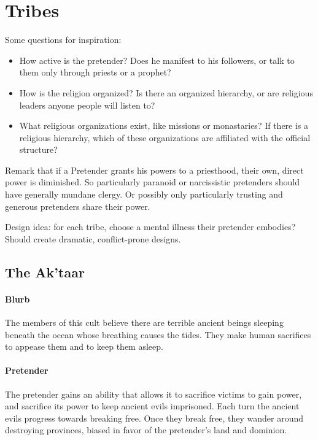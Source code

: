 \documentclass[12pt,letterpaper]{article}
\begin{document}
\section{Tribes}

Some questions for inspiration:
\begin{itemize}
	\item How active is the pretender?
	      Does he manifest to his followers,
	      or talk to them only through priests or a prophet?
	\item How is the religion organized?
	      Is there an organized hierarchy,
	      or are religious leaders anyone people will listen to?
	\item What religious organizations exist,
	      like missions or monastaries?
	      If there is a religious hierarchy,
	      which of these organizations are affiliated with the official structure?
\end{itemize}

Remark that if a Pretender grants his powers to a priesthood,
their own, direct power is diminished.
So particularly paranoid or narcissistic pretenders
should have generally mundane clergy.
Or possibly only particularly trusting and generous pretenders
share their power.

Design idea: for each tribe, choose a mental illness their pretender embodies?
Should create dramatic, conflict-prone designs.

\subsection{The Ak'taar}

\paragraph{Blurb}

The members of this cult believe there are terrible ancient beings
sleeping beneath the ocean whose breathing causes the tides.
They make human sacrifices to appease them and to keep them asleep.

\paragraph{Pretender}

The pretender gains an ability that allows it to sacrifice victims to gain power,
and sacrifice its power to keep ancient evils imprisoned.
Each turn the ancient evils progress towards breaking free.
Once they break free, they wander around destroying provinces,
biased in favor of the pretender's land and dominion.
\end{document}
